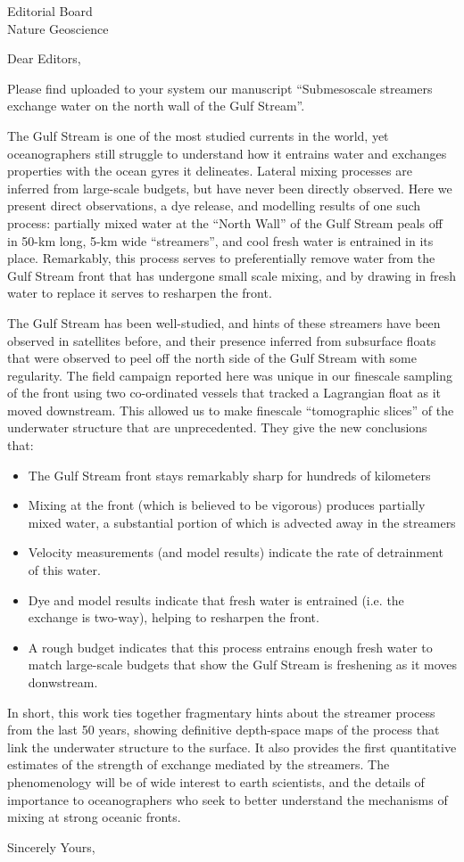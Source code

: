 \documentclass[jmkletter]{scrlttr2}
\begin{document}
  
  \begin{letter}{Editorial Board\\Nature Geoscience
}
    \opening{Dear Editors,}

Please find uploaded to your system our manuscript ``Submesoscale streamers exchange water on the north wall of the Gulf Stream''.  

The Gulf Stream is one of the most studied currents in the world, yet oceanographers still struggle to understand how it entrains water and exchanges properties with the ocean gyres it delineates. Lateral mixing processes are inferred from large-scale budgets, but have never been directly observed.  Here we present direct observations, a dye release, and modelling results of one such process:  partially mixed water at the ``North Wall'' of the Gulf Stream peals off in 50-km long, 5-km wide ``streamers'', and cool fresh water is entrained in its place.  Remarkably, this process serves to preferentially remove water from the Gulf Stream front that has undergone small scale mixing, and by drawing in fresh water to replace it serves to resharpen the front.  

The Gulf Stream has been well-studied, and hints of these streamers have been observed in satellites before, and their presence inferred from subsurface floats that were observed to peel off the north side of the Gulf Stream with some regularity.  The field campaign reported here was unique in our finescale sampling of the front using two co-ordinated vessels that tracked a Lagrangian float as it moved downstream.  This allowed us  to make finescale ``tomographic slices'' of the underwater structure that are unprecedented.  They give the new conclusions that:
\begin{itemize}
  \item The Gulf Stream front stays remarkably sharp for hundreds of kilometers
  \item Mixing at the front (which is believed to be vigorous) produces partially mixed water, a substantial portion of which is advected away in the streamers
  \item Velocity measurements (and model results) indicate the rate of detrainment of this water.
  \item Dye and model results indicate that fresh water is entrained (i.e. the exchange is two-way), helping to resharpen the front.
  \item A rough budget indicates that this process  entrains enough fresh water to match large-scale budgets that show the Gulf Stream is freshening as it moves donwstream.  
\end{itemize}

In short, this work ties together fragmentary hints about the streamer process from the last 50 years, showing definitive depth-space maps of the process that link the underwater structure to the surface.  It also provides the first quantitative estimates of the strength of exchange mediated by the streamers.  The phenomenology will be of wide interest to earth scientists, and the details of importance to oceanographers who seek to better understand the mechanisms of mixing at strong oceanic fronts.  


    \closing{Sincerely Yours,}
  \end{letter}
 
\end{document}
